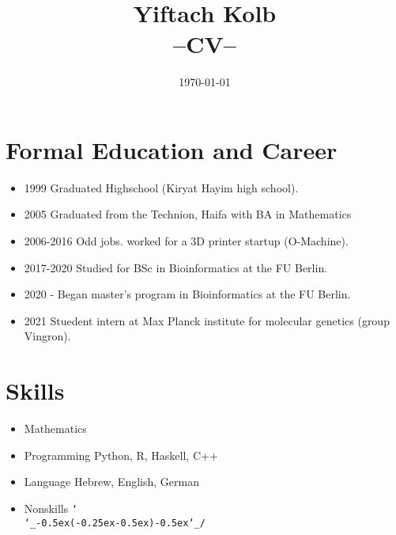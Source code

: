\documentclass[a4paper,10pt]{article}
\def\shrug{\texttt{\raisebox{0.75em}{\char`\_}\char`\\\char`\_\kern-0.5ex(\kern-0.25ex\raisebox{0.25ex}{\rotatebox{45}{\raisebox{-.75ex}"\kern-1.5ex\rotatebox{-90})}}\kern-0.5ex)\kern-0.5ex\char`\_/\raisebox{0.75em}{\char`\_}}}
\begin{document}
\renewcommand{\thesubsection}{\thesection.\alph{subsection}}\renewcommand{\thesubsection}{\thesection.\alph{subsection}}



\title{
Yiftach Kolb \\
--CV--
}

\date{\today}

\maketitle

\section*{Formal Education and Career}

\begin{itemize}
\item{1999} Graduated Highschool (Kiryat Hayim high school).
\item{2005} Graduated from the Technion, Haifa with BA in Mathematics
\item{2006-2016} Odd jobs.
worked for a 3D printer startup (O-Machine).
\item{2017-2020} Studied for BSc in Bioinformatics at the FU Berlin.
\item{2020 - } Began master's program in Bioinformatics at the FU Berlin.
\item{2021} Stuedent intern at Max Planck institute for molecular genetics (group Vingron).
\end{itemize}

\section*{Skills}
\begin{itemize}
\item{Mathematics}
\item{Programming}
\subitem{} Python, R, Haskell, C++
\item{Language}
\subitem{} Hebrew, English, German
\item{Nonskills}
\subitem{}
\normalsize\shrug


\end{itemize}
\end{document}
